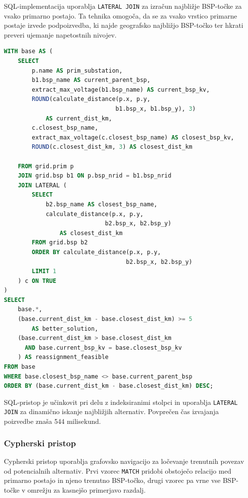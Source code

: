 \documentclass[a4paper,12pt,openright]{book}
\begin{document}
SQL-implementacija uporablja \texttt{LATERAL JOIN} za izračun najbližje BSP-točke za vsako primarno postajo. Ta tehnika omogoča, da se za vsako vrstico primarne postaje izvede podpoizvedba, ki najde geografsko najbližjo BSP-točko ter hkrati preveri ujemanje napetostnih nivojev.

\begin{lstlisting}[language=SQL, caption={SQL pristop - ključni del poizvedbe}, captionpos=b, label={lst:reassignment_sql}]
WITH base AS (
    SELECT
        p.name AS prim_substation,
        b1.bsp_name AS current_parent_bsp,
        extract_max_voltage(b1.bsp_name) AS current_bsp_kv,
        ROUND(calculate_distance(p.x, p.y, 
                                b1.bsp_x, b1.bsp_y), 3) 
            AS current_dist_km,
        c.closest_bsp_name,
        extract_max_voltage(c.closest_bsp_name) AS closest_bsp_kv,
        ROUND(c.closest_dist_km, 3) AS closest_dist_km

    FROM grid.prim p
    JOIN grid.bsp b1 ON p.bsp_nrid = b1.bsp_nrid
    JOIN LATERAL (
        SELECT
            b2.bsp_name AS closest_bsp_name,
            calculate_distance(p.x, p.y, 
                             b2.bsp_x, b2.bsp_y) 
                AS closest_dist_km
        FROM grid.bsp b2
        ORDER BY calculate_distance(p.x, p.y, 
                                   b2.bsp_x, b2.bsp_y)
        LIMIT 1
    ) c ON TRUE
)
SELECT
    base.*,
    (base.current_dist_km - base.closest_dist_km) >= 5 
        AS better_solution,
    (base.current_dist_km > base.closest_dist_km
      AND base.current_bsp_kv = base.closest_bsp_kv
    ) AS reassignment_feasible
FROM base
WHERE base.closest_bsp_name <> base.current_parent_bsp
ORDER BY (base.current_dist_km - base.closest_dist_km) DESC;
\end{lstlisting}

SQL-pristop je učinkovit pri delu z indeksiranimi stolpci in uporablja \texttt{LATERAL JOIN} za dinamično iskanje najbližjih alternativ. Povprečen čas izvajanja poizvedbe znaša 544 milisekund.

\subsubsection{Cypherski pristop}

Cypherski pristop uporablja grafovsko navigacijo za ločevanje trenutnih povezav od potencialnih alternativ. Prvi vzorec \texttt{MATCH} pridobi obstoječo relacijo med primarno postajo in njeno trenutno BSP-točko, drugi vzorec pa vrne vse BSP-točke v omrežju za kasnejšo primerjavo razdalj.
\end{document}
